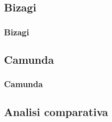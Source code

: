\documentclass[compress,9pt]{beamer}
\begin{document}
\renewcommand{\progname}{Bizagi}
\subsection{\progname}
\begin{frame}%
\frametitle{\progname}
\end{frame}

\renewcommand{\progname}{Camunda}
\subsection{\progname}
\begin{frame}%
\frametitle{\progname}
\end{frame}

\subsection{Analisi comparativa}
\end{document}
